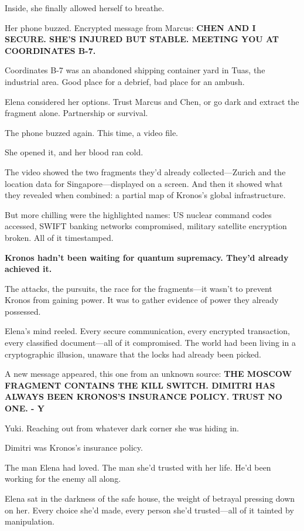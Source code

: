 \documentclass[12pt,letterpaper]{book}
\begin{document}
Inside, she finally allowed herself to breathe.

Her phone buzzed. Encrypted message from Marcus: \textbf{CHEN AND I SECURE. SHE'S INJURED BUT STABLE. MEETING YOU AT COORDINATES B-7.}

Coordinates B-7 was an abandoned shipping container yard in Tuas, the industrial area. Good place for a debrief, bad place for an ambush.

Elena considered her options. Trust Marcus and Chen, or go dark and extract the fragment alone. Partnership or survival.

The phone buzzed again. This time, a video file.

She opened it, and her blood ran cold.

The video showed the two fragments they'd already collected---Zurich and the location data for Singapore---displayed on a screen. And then it showed what they revealed when combined: a partial map of Kronos's global infrastructure.

But more chilling were the highlighted names: US nuclear command codes accessed, SWIFT banking networks compromised, military satellite encryption broken. All of it timestamped.

\textbf{Kronos hadn't been waiting for quantum supremacy. They'd already achieved it.}

The attacks, the pursuits, the race for the fragments---it wasn't to prevent Kronos from gaining power. It was to gather evidence of power they already possessed.

Elena's mind reeled. Every secure communication, every encrypted transaction, every classified document---all of it compromised. The world had been living in a cryptographic illusion, unaware that the locks had already been picked.

A new message appeared, this one from an unknown source: \textbf{THE MOSCOW FRAGMENT CONTAINS THE KILL SWITCH. DIMITRI HAS ALWAYS BEEN KRONOS'S INSURANCE POLICY. TRUST NO ONE. - Y}

Yuki. Reaching out from whatever dark corner she was hiding in.

Dimitri was Kronos's insurance policy.

The man Elena had loved. The man she'd trusted with her life. He'd been working for the enemy all along.

Elena sat in the darkness of the safe house, the weight of betrayal pressing down on her. Every choice she'd made, every person she'd trusted---all of it tainted by manipulation.
\end{document}
